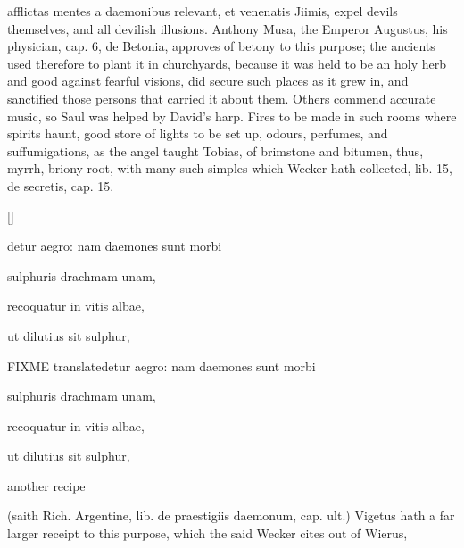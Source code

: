 {{afflictas mentes a daemonibus relevant, et venenatis Jiimis}, expel
devils themselves, and all devilish illusions. Anthony Musa, the
Emperor Augustus, his physician, cap. 6, de Betonia, approves of betony
to this purpose; the ancients used therefore to plant it in
churchyards, because it was held to be an holy herb and good against
fearful visions, did secure such places as it grew in, and sanctified
those persons that carried it about them.  Others commend accurate music, so Saul was helped by
David's harp. Fires to be made in such rooms where spirits haunt, good
store of lights to be set up, odours, perfumes, and suffumigations, as
the angel taught Tobias, of brimstone and bitumen, thus, myrrh, briony
root, with many such simples which Wecker hath collected, lib. 15, de
secretis, cap. 15.

\begin{Prescription}[H]
[\baselineskip]
\begin{prescriptionbox}{}{\textlatin{detur aegro: nam daemones sunt morbi}}
\item \textlatin{sulphuris drachmam unam},
\item \textlatin{recoquatur in vitis albae},
\item \textlatin{ut dilutius sit sulphur},
\end{prescriptionbox}
\begin{prescriptionbox}{FIXME translate}{\textlatin{detur aegro: nam daemones sunt morbi}}
\item \textlatin{sulphuris drachmam unam},
\item \textlatin{recoquatur in vitis albae},
\item \textlatin{ut dilutius sit sulphur},
\end{prescriptionbox}
\caption{another recipe}
\end{Prescription}

(saith Rich. Argentine, \textlatin{lib. de praestigiis daemonum, cap. ult.})
Vigetus hath a far larger receipt to this purpose, which the said
Wecker cites out of Wierus,

}
